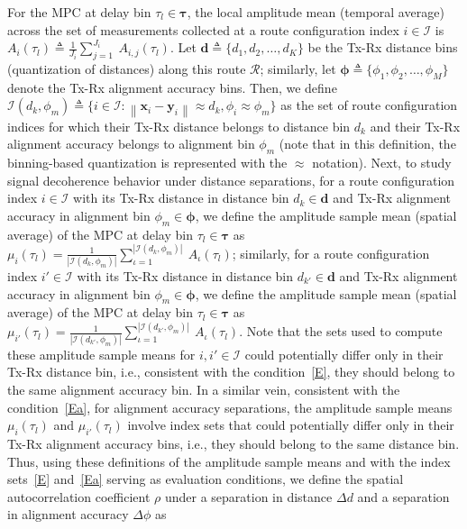 \documentclass[10pt, twocolumn]{IEEEtran}
\newcommand{\norm}[1]{\left\lVert#1\right\rVert}
\begin{document}
{For the MPC at delay bin $\tau_{l} \in \boldsymbol{\tau}$, the local amplitude mean (temporal average) across the set of measurements collected at a route configuration index $i \in \mathcal{I}$ is $A_{i}(\tau_{l}) \triangleq \frac{1}{J_{i}}\sum_{j = 1}^{J_{i}}\ A_{i,j}(\tau_{l})$. Let $\mathbf{d} \triangleq \{d_{1},d_{2},{\dots},d_{K}\}$ be the Tx-Rx distance bins (quantization of distances) along this route $\mathcal{R}$; similarly, let $\boldsymbol{\phi} \triangleq \{\phi_{1},\phi_{2},{\dots},\phi_{M}\}$ denote the Tx-Rx alignment accuracy bins. Then, we define $\mathcal{I}(d_{k}, \phi_{m}) \triangleq \{i \in \mathcal{I}: \norm{\mathbf{x}_{i} - \mathbf{y}_{i}} \approx d_{k}, \phi_{i} \approx \phi_{m}\}$ as the set of route configuration indices for which their Tx-Rx distance belongs to distance bin $d_{k}$ and their Tx-Rx alignment accuracy belongs to alignment bin $\phi_{m}$ (note that in this definition, the binning-based quantization is represented with the $\approx$ notation). Next, to study signal decoherence behavior under distance separations, for a route configuration index $i \in \mathcal{I}$ with its Tx-Rx distance in distance bin $d_{k} \in \mathbf{d}$ and Tx-Rx alignment accuracy in alignment bin $\phi_{m} \in \boldsymbol{\phi}$, we define the amplitude sample mean (spatial average) of the MPC at delay bin $\tau_{l} \in \boldsymbol{\tau}$ as $\mu_{i}(\tau_{l}) = \frac{1}{|\mathcal{I}(d_{k}, \phi_{m})|}\sum_{\iota = 1}^{|\mathcal{I}(d_{k}, \phi_{m})|}\ A_{\iota}(\tau_{l})$; similarly, for a route configuration index $i' \in \mathcal{I}$ with its Tx-Rx distance in distance bin $d_{k'} \in \mathbf{d}$ and Tx-Rx alignment accuracy in alignment bin $\phi_{m} \in \boldsymbol{\phi}$, we define the amplitude sample mean (spatial average) of the MPC at delay bin $\tau_{l} \in \boldsymbol{\tau}$ as $\mu_{i'}(\tau_{l}) = \frac{1}{|\mathcal{I}(d_{k'}, \phi_{m})|}\sum_{\iota = 1}^{|\mathcal{I}(d_{k'}, \phi_{m})|}\ A_{\iota}(\tau_{l})$. Note that the sets used to compute these amplitude sample means for $i, i' \in \mathcal{I}$ could potentially differ only in their Tx-Rx distance bin, i.e., consistent with the condition~\eqref{E}, they should belong to the same alignment accuracy bin. In a similar vein, consistent with the condition~\eqref{Ea}, for alignment accuracy separations, the amplitude sample means $\mu_{i}(\tau_{l})$ and $\mu_{i'}(\tau_{l})$ involve index sets that could potentially differ only in their Tx-Rx alignment accuracy bins, i.e., they should belong to the same distance bin. Thus, using these definitions of the amplitude sample means and with the index sets~\eqref{E} and~\eqref{Ea} serving as evaluation conditions, we define the spatial autocorrelation coefficient $\rho$ under a separation in distance $\Delta d$ and a separation in alignment accuracy $\Delta \phi$ as
}
\end{document}
